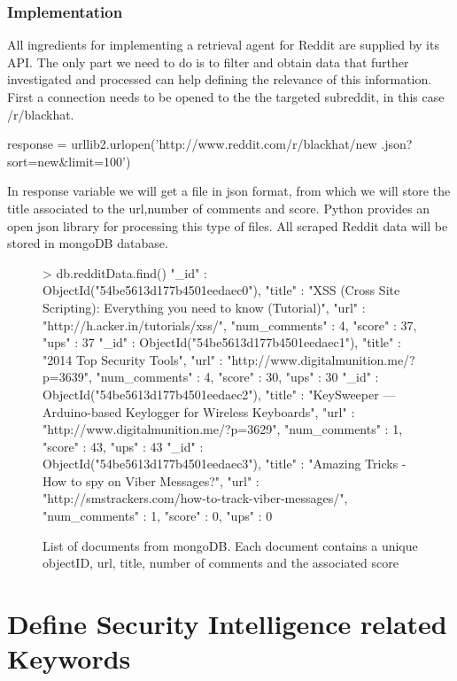 \documentclass[12pt]{article}
\begin{document}
\subsubsection{Implementation}

All ingredients for implementing a retrieval agent for Reddit are supplied by its API. The only part we need to do is to filter and obtain data that further investigated and processed can help defining the relevance of this information. First a connection needs to be opened to the the targeted subreddit, in this case /r/blackhat. 
\begin{spverbatim}
response = urllib2.urlopen('http://www.reddit.com/r/blackhat/new
			.json?sort=new&limit=100')
\end{spverbatim}
\hfill \break
In response variable we will get a file in json format, from which we will store the title associated to the url,number of comments and score. Python provides an open json library for processing this type of files. All scraped Reddit data will be stored in mongoDB database.

\begin{figure}[h!]
\begin{spverbatim}
> db.redditData.find()
{ "_id" : ObjectId("54be5613d177b4501eedaec0"), "title" : "XSS (Cross Site Scripting): Everything you need to know (Tutorial)", "url" : "http://h.acker.in/tutorials/xss/", "num_comments" : 4, "score" : 37, "ups" : 37 }
{ "_id" : ObjectId("54be5613d177b4501eedaec1"), "title" : "2014 Top Security Tools", "url" : "http://www.digitalmunition.me/?p=3639", "num_comments" : 4, "score" : 30, "ups" : 30 }
{ "_id" : ObjectId("54be5613d177b4501eedaec2"), "title" : "KeySweeper — Arduino-based Keylogger for Wireless Keyboards", "url" : "http://www.digitalmunition.me/?p=3629", "num_comments" : 1, "score" : 43, "ups" : 43 }
{ "_id" : ObjectId("54be5613d177b4501eedaec3"), "title" : "Amazing Tricks - How to spy on Viber Messages?", "url" : "http://smstrackers.com/how-to-track-viber-messages/", "num_comments" : 1, "score" : 0, "ups" : 0 }
\end{spverbatim}
\captionsetup{font=small}
\caption{List of documents from mongoDB. Each document contains a unique objectID, url, title, number of comments and the associated score  }
\end{figure}

\newpage
\section{Define Security Intelligence related Keywords}
\end{document}
